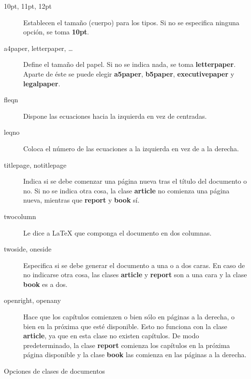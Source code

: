 \begin{table}[htbp]
\centering
	\hrulefill
	\begin{description}
	\item[10pt, 11pt, 12pt] Establecen el tama\~no (cuerpo) para los tipos. Si no se especifica ninguna opci\'on, 
	se toma \textbf{10pt}.
	\item[a4paper, letterpaper, \ldots] Define el tama\~no del papel. Si no se indica nada, se toma \textbf{letterpaper}. 
				Aparte de \'este se puede elegir \textbf{a5paper}, \textbf{b5paper}, \textbf{executivepaper} y \textbf{legalpaper}.
	\item[fleqn] Dispone las ecuaciones hacia la izquierda en vez de centradas.
	\item[leqno] Coloca el n\'umero de las ecuaciones a la izquierda en vez de a la derecha.
	\item[titlepage, notitlepage] Indica si se debe comenzar una p\'agina nueva tras el t\'itulo del documento o no. Si no 
				se indica otra cosa, la clase \textbf{article} no comienza una p\'agina nueva, mientras que \textbf{report} y 
				\textbf{book} s\'i.
	\item[twocolumn] Le dice a \LaTeX{} que componga el documento en dos columnas.
	\item[twoside, oneside] Especifica si se debe generar el documento a una o a dos caras. En caso de no indicarse otra 
				cosa, las clases \textbf{article} y \textbf{report} son a una cara y la clase \textbf{book} es a dos.
	\item[openright, openany] Hace que los cap\'itulos comienzen o bien s\'olo en p\'aginas a la derecha, o bien en la 
				pr\'oxima que est\'e disponible. Esto no funciona con la clase \textbf{article}, ya que en esta clase no 
				existen cap\'itulos. De modo predeterminado, la clase \textbf{report} comienza los cap\'itulos en la pr\'oxima 
				p\'agina disponible y la clase \textbf{book} las comienza en las p\'aginas a la derecha.
	\end{description}
	\hrulefill
\caption{Opciones de clases de documentos}
\label{tab:opciones}
\end{table}
  
				
